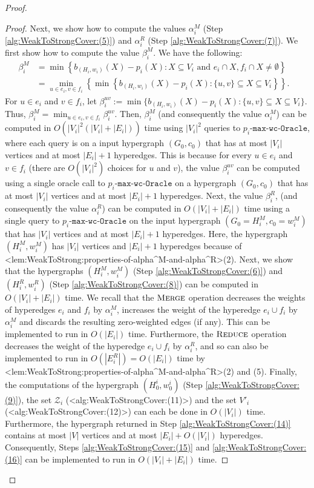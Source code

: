 \documentclass{article}
\def\Cref#1{<#1>}%
\newcommand{\zeros}{\ensuremath{\mathcal{Z}}\xspace}
\newcommand{\functionMaximizationOracle}[1]{\ensuremath{{#1}\text{-}\mathtt{max}\text{-}\mathtt{wc}\text{-}\mathtt{Oracle}}\xspace}
\newcommand{\merge}{\ensuremath{\textsc{Merge}}\xspace}
\newcommand{\reduce}{\ensuremath{\textsc{Reduce}}\xspace}
\begin{document}
\begin{proof}
\begin{proof}
Next, we show how to compute the values $\alpha_i^M$ (Step \ref{alg:WeakToStrongCover:(5)}) and $\alpha^R_i$ (Step \ref{alg:WeakToStrongCover:(7)}).  We first show how to compute the value $\beta_i^M$.
We have the following:
\begin{align*}
    \beta_i^M& = \min\left\{b_{(H_i,w_i)}(X) - p_i(X) : X \subseteq V_i \text{ and } e_i \cap X, f_i \cap X \not = \emptyset\right\} &\\
    & = \min_{u \in e_i, v \in f_i}\left\{\min\left\{b_{(H_i,w_i)}(X) - p_i(X) : \{u,v\} \subseteq X \subseteq V_i\right\}\right\}.&
\end{align*}
For $u \in e_i$ and $v \in f_i$, let $\beta_i^{uv} := \min\{b_{(H_i,w_i)}(X) - p_i(X) : \{u,v\} \subseteq X \subseteq V_i\}.$ Thus, $\beta_i^M = \min_{u \in e_i, v\in f_i}\beta_i^{uv}$.
Then, $\beta_i^M$ (and consequently the value $\alpha_i^M$) can be computed in $O(|V_i|^2(|V_i| + |E_i|))$ time using 
$|V_i|^2$ queries to \functionMaximizationOracle{p_i}, where each query is on a input hypergraph $(G_0, c_0)$ that has at most $|V_i|$ vertices and at most $|E_i|+1$ hyperedges. This is because for every $u \in e_i$ and $v \in f_i$ (there are $O(|V_i|^2)$ choices for $u$ and $v$), the value $\beta_i^{uv}$ can be computed using a single oracle call to \functionMaximizationOracle{p_i} on a hypergraph $(G_0, c_0)$ that has at most $|V_i|$ vertices and at most $|E_i|+1$ hyperedges.
Next, the value $\beta^R_i$, (and consequently the value $\alpha^R_i$)  can be computed 
in $O(|V_i| + |E_i|)$ time using a single query to \functionMaximizationOracle{p_i} on the input hypergraph $(G_0=H_i^M, c_0=w_i^M)$ that has  $|V_i|$ vertices and at most $|E_i|+1$ hyperedges. Here, the hypergraph $(H_i^M, w_i^M)$ has  $|V_i|$ vertices and $|E_i|+1$ hyperedges because of  \Cref{lem:WeakToStrong:properties-of-alpha^M-and-alpha^R}(2).
Next, we show that the hypergraphs $(H_i^M, w_i^M)$ (Step \ref{alg:WeakToStrongCover:(6)}) and $(H_i^R, w_i^R)$ (Step \ref{alg:WeakToStrongCover:(8)}) can be computed in $O(|V_i| + |E_i|)$ time. We recall that the \merge operation decreases the weights of hyperedges $e_i$ and $f_i$ by $\alpha_i^M$,  increases the weight of the hyperedge $e_i\cup f_i$ by $\alpha_i^M$ and discards the resulting zero-weighted edges (if any). This can be implemented to run in $O(|E_i|)$ time. Furthermore, the \reduce operation decreases the weight of the hyperedge $e_i\cup f_i$ by $\alpha^R_i$, and so can also be implemented to run in $O(|E^R_i|) = O(|E_i|)$ time by \Cref{lem:WeakToStrong:properties-of-alpha^M-and-alpha^R}(2) and (5). Finally, the computations of the hypergraph $(H^{i}_0, w^{i}_0)$ (Step \ref{alg:WeakToStrongCover:(9)}), the set $\zeros_i$ (\Cref{alg:WeakToStrongCover:(11)}) and the set $V'_i$  (\Cref{alg:WeakToStrongCover:(12)}) can each be done in $O(|V_i|)$ time. Furthermore, the hypergraph returned in Step \ref{alg:WeakToStrongCover:(14)} contains at most $|V|$ vertices and at most $|E_i| + O(|V_i|)$ hyperedges. Consequently, Steps \ref{alg:WeakToStrongCover:(15)} and \ref{alg:WeakToStrongCover:(16)}  can be implemented to run in $O(|V_i| + |E_i|)$ time. 
\end{proof}


\end{proof}
\end{document}
